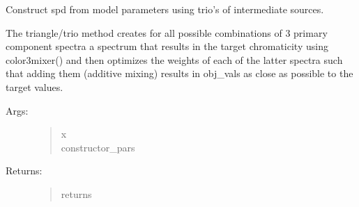 \documentclass[letterpaper,10pt,english]{sphinxmanual}
\begin{document}
\begin{fulllineitems}
\begin{description}
\begin{quote}
\begin{description}
\end{description}\end{quote}

\end{description}

\end{fulllineitems}


\begin{fulllineitems}
\label{\detokenize{toolboxes:luxpy.toolboxes.spdbuild.spd_constructor_3}}
Construct spd from model parameters using trio’s of intermediate sources.

\begin{DUlineblock}{0em}
\item[] The triangle/trio method creates for all possible combinations of 3 primary
component spectra a spectrum that results in the target chromaticity 
using color3mixer() and then optimizes the weights of each of the latter 
spectra such that adding them (additive mixing) results in obj\_vals as 
close as possible to the target values.
\end{DUlineblock}
\begin{description}
\item[{Args:}] \leavevmode\begin{quote}\begin{description}
\item[{x}] \leavevmode
{}

\item[{constructor\_pars}] \leavevmode
{}

\end{description}\end{quote}

\item[{Returns:}] \leavevmode\begin{quote}\begin{description}
\item[{returns}] \leavevmode
{}


\end{description}
\end{quote}
\end{description}
\end{fulllineitems}
\end{document}
